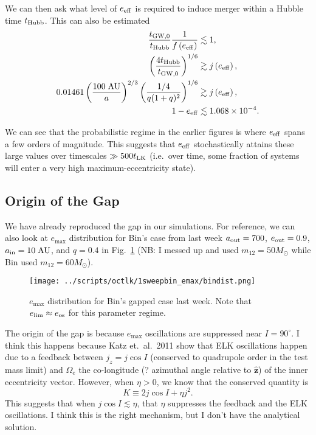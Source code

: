 \documentclass[11pt,
        usenames, %
        dvipsnames %
    ]{article}
\newcommand*{\bm}[1]{\boldsymbol{\mathbf{#1}}}
\newcommand*{\uv}[1]{\hat{\bm{#1}}}
\newcommand*{\p}[1]{\left(#1\right)}
\begin{document}
We can then ask what level of $e_{\rm eff}$ is required to induce
merger within a Hubble time $t_{\rm Hubb}$. This can also be estimated
\begin{align}
    \frac{t_{\rm GW, 0}}{t_{\rm Hubb}}\frac{1}{f\p{e_{\rm eff}}}
        &\lesssim 1,\\
    \p{\frac{4t_{\rm Hubb}}{t_{\rm GW, 0}}}^{1/6}
        &\gtrsim j\p{e_{\rm eff}},\\
    0.01461\p{\frac{100\;\mathrm{AU}}{a}}^{2/3}
        \p{\frac{1/4}{q(1 + q)^2}}^{1/6}
        &\gtrsim j\p{e_{\rm eff}},\\
    1 - e_{\rm eff} &\lesssim 1.068 \times 10^{-4}.
\end{align}

We can see that the probabilistic regime in the earlier figures is where $e_{\rm
eff}$ spans a few orders of magnitude. This suggests that $e_{\rm eff}$
stochastically attains these large values over timescales $\gg 500 t_{\rm LK}$
(i.e.\ over time, some fraction of systems will enter a very high
maximum-eccentricity state).

\subsection{Origin of the Gap}

We have already reproduced the gap in our simulations. For reference, we can
also look at $e_{\max}$ distribution for Bin's case from last week $a_{\rm out}
= 700$, $e_{\rm out} = 0.9$, $a_{\rm in} = 10\;\mathrm{AU}$, and $q = 0.4$ in
Fig.~\ref{fig:bindist_emax} (NB\@: I messed up and used $m_{12} = 50M_{\odot}$
while Bin used $m_{12} = 60M_{\odot}$).
\begin{figure}
    \centering
    \texttt{[image: ../scripts/octlk/1sweepbin\_emax/bindist.png]}
    \caption{$e_{\max}$ distribution for Bin's gapped case last week. Note that
    $e_{\lim} \approx e_{\rm os}$ for this parameter regime.}\label{fig:bindist_emax}
\end{figure}

The origin of the gap is because $e_{\max}$ oscillations are suppressed near $I
= 90^\circ$. I think this happens because Katz et.\ al.\ 2011 show that ELK
oscillations happen due to a feedback between $j_z = j\cos I$ (conserved to
quadrupole order in the test mass limit) and $\Omega_e$ the co-longitude (?
azimuthal angle relative to $\uv{z}$) of the inner eccentricity vector. However,
when $\eta > 0$, we know that the conserved quantity is
\begin{equation}
    K \equiv 2j\cos I + \eta j^2.
\end{equation}
This suggests that when $j \cos I \lesssim \eta$, that $\eta$ suppresses the
feedback and the ELK oscillations. I think this is the right mechanism, but I
don't have the analytical solution.
\end{document}

